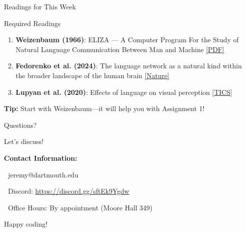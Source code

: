 \documentclass[aspectratio=169]{beamer}
\begin{document}
\begin{frame}{Readings for This Week 📖}
\begin{block}{Required Readings}
\begin{enumerate}\setlength{\itemsep}{0pt}
    \item \textbf{Weizenbaum (1966)}: ELIZA — A Computer Program For the Study of Natural Language Communication Between Man and Machine
    \href{https://web.stanford.edu/class/cs124/p36-weizenabaum.pdf}{[PDF]}

    \item \textbf{Fedorenko et al. (2024)}: The language network as a natural kind within the broader landscape of the human brain
    \href{https://www.nature.com/articles/s41586-024-07522-w}{[Nature]}

    \item \textbf{Lupyan et al. (2020)}: Effects of language on visual perception
    \href{https://doi.org/10.1016/j.tics.2020.08.005}{[TICS]}
\end{enumerate}
\end{block}

\vspace{0.3cm}

\textbf{Tip:} Start with Weizenbaum—it will help you with Assignment 1!
\end{frame}

\begin{frame}{Questions? 🤔}
\begin{center}
\Large{Let's discuss!}

\vspace{0.5cm}

\textbf{Contact Information:}

📧 jeremy@dartmouth.edu

💬 Discord: \href{https://discord.gg/sftEk9Ygdw}{https://discord.gg/sftEk9Ygdw}

🏢 Office Hours: By appointment (Moore Hall 349)

\vspace{0.5cm}

\large{Happy coding! 🚀}
\end{center}
\end{frame}
\end{document}
